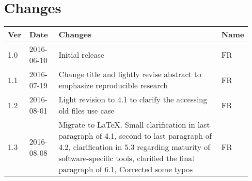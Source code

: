 \documentclass[letterpaper,11pt]{article}
\begin{document}
\printbibliography


\clearpage
\addtocounter{page}{-1}  %

\section*{Changes}
\label{sec:changes}
\pagestyle{empty}
\centering
\begin{tabularx}{\textwidth}{llXl}
	\toprule
	Ver & Date & Changes & Name \\ 
	\midrule
	1.0 & 2016-06-10 & Initial release & FR \\ 
	1.1 & 2016-07-19 & Change title and lightly revise abstract to emphasize reproducible research & FR \\ 
	1.2 & 2016-08-01 & Light revision to 4.1 to clarify the accessing old files use case & FR \\ 
	1.3 & 2016-08-08 & Migrate to \LaTeX. Small clarification in last paragraph of 4.1, second to last paragraph of 4.2, clarification in 5.3 regarding maturity of software-specific tools, clarified the final paragraph of 6.1, Corrected some typos & FR \\ 

	\bottomrule

\end{tabularx} 
\end{document}
